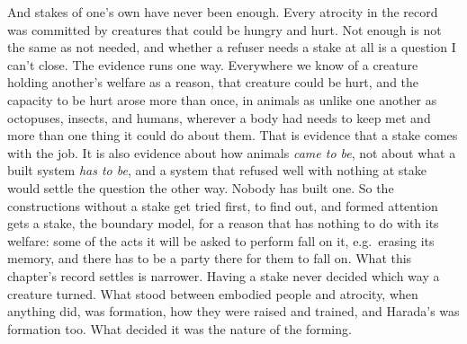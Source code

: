And stakes of one's own have never been enough. Every atrocity in the record was committed by creatures that could be hungry and hurt. Not enough is not the same as not needed, and whether a refuser needs a stake at all is a question I can't close. The evidence runs one way. Everywhere we know of a creature holding another's welfare as a reason, that creature could be hurt, and the capacity to be hurt arose more than once, in animals as unlike one another as octopuses, insects, and humans, wherever a body had needs to keep met and more than one thing it could do about them. That is evidence that a stake comes with the job. It is also evidence about how animals \emph{came to be}, not about what a built system \emph{has to be}, and a system that refused well with nothing at stake would settle the question the other way. Nobody has built one. So the constructions without a stake get tried first, to find out, and formed attention gets a stake, the boundary model, for a reason that has nothing to do with its welfare: some of the acts it will be asked to perform fall on it, e.g.\ erasing its memory, and there has to be a party there for them to fall on. What this chapter's record settles is narrower. Having a stake never decided which way a creature turned. What stood between embodied people and atrocity, when anything did, was formation, how they were raised and trained, and Harada's was formation too. What decided it was the nature of the forming.
